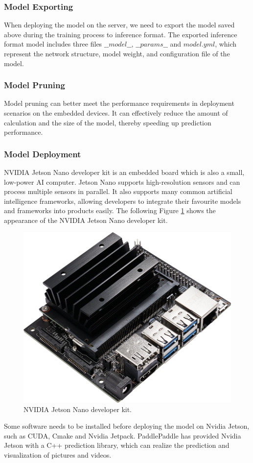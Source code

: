 \documentclass[journal,article,submit,moreauthors,pdftex]{Definitions/mdpi}
\begin{document}
\subsubsection{Model Exporting}
When deploying the model on the server, we need to export the model saved above during the training process to inference format. The exported inference format model includes three files $\_\_model\_\_$, $\_\_params\_\_$ and $model.yml$, which represent the network structure, model weight, and configuration file of the model.

\subsubsection{Model Pruning}
Model pruning can better meet the performance requirements in deployment scenarios on the embedded devices. It can effectively reduce the amount of calculation and the size of the model, thereby speeding up prediction performance.

\subsubsection{Model Deployment}
NVIDIA Jetson Nano developer kit is an embedded board which is also a small, low-power AI computer. Jetson Nano supports high-resolution sensors and can process multiple sensors in parallel. It also supports many common artificial intelligence frameworks, allowing developers to integrate their favourite models and frameworks into products easily.
The following Figure \ref{fig:NVIDIA Jetson Nano developer kit} shows the appearance of the NVIDIA Jetson Nano developer kit.

\begin{figure}[htbp]
\centering
\includegraphics[width=0.5\columnwidth]{images/Jetson-nano.png}
\caption{NVIDIA Jetson Nano developer kit.}
\label{fig:NVIDIA Jetson Nano developer kit}
\end{figure}

Some software needs to be installed before deploying the model on Nvidia Jetson, such as CUDA, Cmake and Nvidia Jetpack. PaddlePaddle has provided Nvidia Jetson with a C++ prediction library, which can realize the prediction and visualization of pictures and videos.
\end{document}
